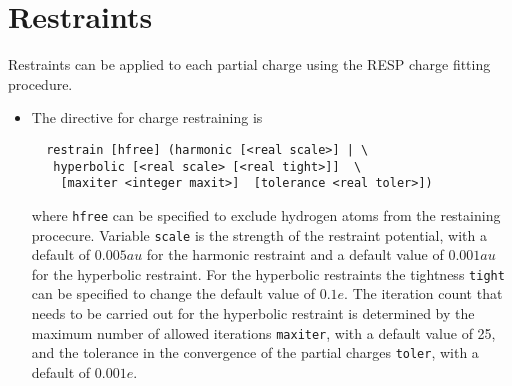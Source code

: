 \section{Restraints}
Restraints can be applied to each partial charge using the RESP charge
fitting procedure.
\begin{itemize}
\item
The directive for charge restraining is
\begin{verbatim}
  restrain [hfree] (harmonic [<real scale>] | \
   hyperbolic [<real scale> [<real tight>]]  \
    [maxiter <integer maxit>]  [tolerance <real toler>])
\end{verbatim}
where \verb+hfree+ can be specified to exclude hydrogen atoms from the
restaining procecure. Variable \verb+scale+ is the strength of the 
restraint potential, with a default of $0.005 au$ for the harmonic
restraint and a default value of $0.001 au$ for the hyperbolic restraint.
For the hyperbolic restraints the tightness \verb+tight+ can be specified
to change the default value of $0.1 e$. The iteration count that needs to
be carried out for the hyperbolic restraint is determined by the
maximum number of allowed iterations \verb+maxiter+, with a default value
of 25, and the tolerance in the convergence of the partial charges
\verb+toler+, with a default of $0.001 e$.
\end{itemize}
